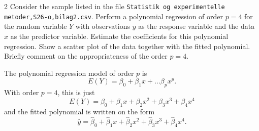     \begin{problem}{2}
      Consider the sample listed in the file \verb#Statistik og experimentelle metoder,S26-o,bilag2.csv#. Perform a polynomial regression of order $p = 4$ for the random variable $Y$ with observations $y$ as the response variable and the data $x$ as the predictor variable. Estimate the coefficients for this polynomial regression.
      Show a scatter plot of the data together with the fitted polynomial.
      Briefly comment on the appropriateness of the order $p = 4$.
    \end{problem}

    \begin{derivation}
      The polynomial regression model of order $p$ is
      \begin{equation*}
        E(Y) = \beta_0 + \beta_1 x + \ldots \beta_p x^{p}
      .\end{equation*}
      With order $p = 4$, this is just
      \begin{equation*}
        E(Y) = \beta_0 + \beta_1 x + \beta_2x^2 + \beta_3 x^3 + \beta_4 x^{4}
      \end{equation*}
      and the fitted polynomial is written on the form
      \begin{equation*}
        \hat{y} = \hat{\beta}_0 + \hat{\beta}_1 x + \hat{\beta}_2 x^2 + \hat{\beta}_3 x^3 + \hat{\beta}_4 x^{4}
      .\end{equation*}
      

\end{derivation}
